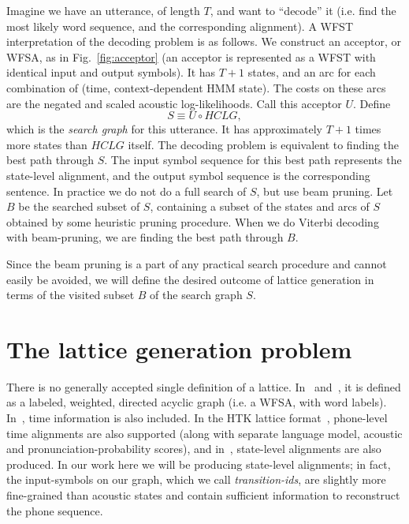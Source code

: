 \documentclass{article}
\def\HCLG{{\mathit{HCLG}}}
\begin{document}
Imagine we have an utterance, of length $T$, and want to ``decode'' it (i.e. find
the most likely word sequence, and the corresponding alignment).  A WFST
interpretation of the decoding problem is as follows.  We construct an
acceptor, or WFSA, as in Fig.~\ref{fig:acceptor} (an acceptor is represented as a
WFST with identical input and output symbols).  It has $T{+}1$ states,
and an arc for each combination of (time, context-dependent HMM state).  The
costs on these arcs are the negated and scaled acoustic log-likelihoods.
Call this acceptor $U$.  Define
\begin{equation}
   S \equiv U \circ \HCLG,
\end{equation}
which is the {\em search graph} for this utterance.  It has approximately $T+1$ times
more states than $\HCLG$ itself.  The decoding problem is equivalent to finding
the best path through $S$.  The input symbol sequence for this best path represents
the state-level alignment, and the output symbol sequence is the corresponding
sentence.  In practice we do not do a full search of $S$, but use beam pruning.
Let $B$ be the searched subset of $S$, containing a subset of the states and arcs
of $S$ obtained by some heuristic pruning procedure.  
When we do Viterbi decoding with beam-pruning, we are finding the best path through $B$. 

Since the beam pruning is a part of any practical search procedure and cannot
easily be avoided, we will define the desired outcome of lattice generation in terms
of the visited subset $B$ of the search graph $S$.

\section{The lattice generation problem}
\label{sec:lattices}


There is no generally accepted single definition of a lattice.  In~\cite{efficient_general}
and~\cite{sak2010fly}, it is defined as a labeled, weighted, directed acyclic graph
(i.e. a WFSA, with word labels).  In~\cite{ney_word_graph}, time information
is also included.  In the HTK lattice format~\cite{htkbook}, phone-level time alignments 
are also supported (along with separate language model, acoustic and pronunciation-probability 
scores), and in~\cite{saon2005anatomy}, state-level alignments are also produced.
In our work here we will be producing state-level alignments; in fact, the input-symbols
on our graph, which we call {\em transition-ids}, are slightly more fine-grained
than acoustic states and contain sufficient information to reconstruct the phone
sequence.  
\end{document}
